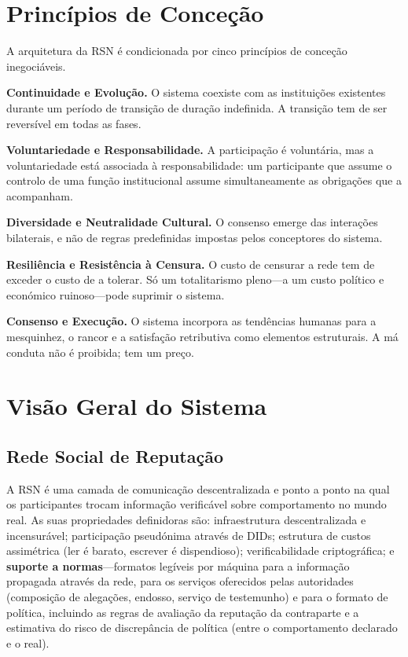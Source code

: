 \documentclass[11pt,a4paper,twocolumn]{article}
\begin{document}
\section{Princípios de Conceção}

A arquitetura da RSN é condicionada por cinco princípios de conceção inegociáveis.

\textbf{Continuidade e Evolução.} O sistema coexiste com as instituições existentes durante um período de transição de duração indefinida. A transição tem de ser reversível em todas as fases.

\textbf{Voluntariedade e Responsabilidade.} A participação é voluntária, mas a voluntariedade está associada à responsabilidade: um participante que assume o controlo de uma função institucional assume simultaneamente as obrigações que a acompanham.

\textbf{Diversidade e Neutralidade Cultural.} O consenso emerge das interações bilaterais, e não de regras predefinidas impostas pelos conceptores do sistema.

\textbf{Resiliência e Resistência à Censura.} O custo de censurar a rede tem de exceder o custo de a tolerar. Só um totalitarismo pleno---a um custo político e económico ruinoso---pode suprimir o sistema.

\textbf{Consenso e Execução.} O sistema incorpora as tendências humanas para a mesquinhez, o rancor e a satisfação retributiva como elementos estruturais. A má conduta não é proibida; tem um preço.

\section{Visão Geral do Sistema}

\subsection{Rede Social de Reputação}

A RSN é uma camada de comunicação descentralizada e ponto a ponto na qual os participantes trocam informação verificável sobre comportamento no mundo real. As suas propriedades definidoras são: infraestrutura descentralizada e incensurável; participação pseudónima através de DIDs; estrutura de custos assimétrica (ler é barato, escrever é dispendioso); verificabilidade criptográfica; e \textbf{suporte a normas}---formatos legíveis por máquina para a informação propagada através da rede, para os serviços oferecidos pelas autoridades (composição de alegações, endosso, serviço de testemunho) e para o formato de política, incluindo as regras de avaliação da reputação da contraparte e a estimativa do risco de discrepância de política (entre o comportamento declarado e o real).
\end{document}
